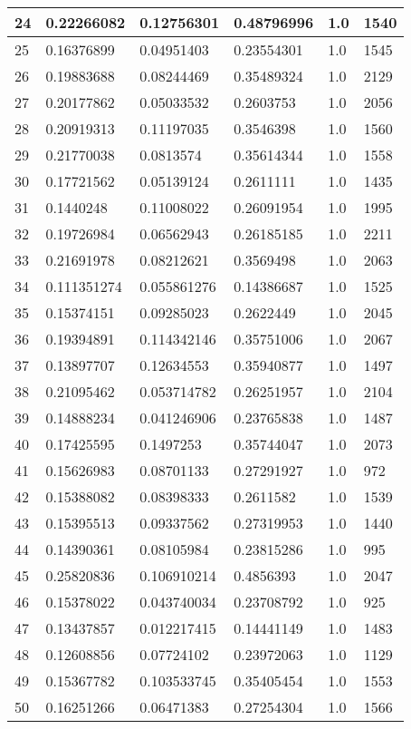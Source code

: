 \begin{longtable}{|l|l|l|l|l|l|}
24 & 0.22266082 & 0.12756301 & 0.48796996 & 1.0 & 1540 \\ \hline 
25 & 0.16376899 & 0.04951403 & 0.23554301 & 1.0 & 1545 \\ \hline 
26 & 0.19883688 & 0.08244469 & 0.35489324 & 1.0 & 2129 \\ \hline 
27 & 0.20177862 & 0.05033532 & 0.2603753 & 1.0 & 2056 \\ \hline 
28 & 0.20919313 & 0.11197035 & 0.3546398 & 1.0 & 1560 \\ \hline 
29 & 0.21770038 & 0.0813574 & 0.35614344 & 1.0 & 1558 \\ \hline 
30 & 0.17721562 & 0.05139124 & 0.2611111 & 1.0 & 1435 \\ \hline 
31 & 0.1440248 & 0.11008022 & 0.26091954 & 1.0 & 1995 \\ \hline 
32 & 0.19726984 & 0.06562943 & 0.26185185 & 1.0 & 2211 \\ \hline 
33 & 0.21691978 & 0.08212621 & 0.3569498 & 1.0 & 2063 \\ \hline 
34 & 0.111351274 & 0.055861276 & 0.14386687 & 1.0 & 1525 \\ \hline 
35 & 0.15374151 & 0.09285023 & 0.2622449 & 1.0 & 2045 \\ \hline 
36 & 0.19394891 & 0.114342146 & 0.35751006 & 1.0 & 2067 \\ \hline 
37 & 0.13897707 & 0.12634553 & 0.35940877 & 1.0 & 1497 \\ \hline 
38 & 0.21095462 & 0.053714782 & 0.26251957 & 1.0 & 2104 \\ \hline 
39 & 0.14888234 & 0.041246906 & 0.23765838 & 1.0 & 1487 \\ \hline 
40 & 0.17425595 & 0.1497253 & 0.35744047 & 1.0 & 2073 \\ \hline 
41 & 0.15626983 & 0.08701133 & 0.27291927 & 1.0 & 972 \\ \hline 
42 & 0.15388082 & 0.08398333 & 0.2611582 & 1.0 & 1539 \\ \hline 
43 & 0.15395513 & 0.09337562 & 0.27319953 & 1.0 & 1440 \\ \hline 
44 & 0.14390361 & 0.08105984 & 0.23815286 & 1.0 & 995 \\ \hline 
45 & 0.25820836 & 0.106910214 & 0.4856393 & 1.0 & 2047 \\ \hline 
46 & 0.15378022 & 0.043740034 & 0.23708792 & 1.0 & 925 \\ \hline 
47 & 0.13437857 & 0.012217415 & 0.14441149 & 1.0 & 1483 \\ \hline 
48 & 0.12608856 & 0.07724102 & 0.23972063 & 1.0 & 1129 \\ \hline 
49 & 0.15367782 & 0.103533745 & 0.35405454 & 1.0 & 1553 \\ \hline 
50 & 0.16251266 & 0.06471383 & 0.27254304 & 1.0 & 1566 \\ \hline 
\end{longtable}